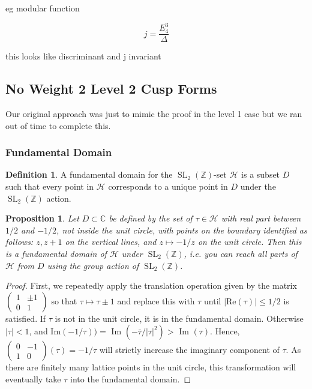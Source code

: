 \documentclass{article}
\newtheorem{proposition}{Proposition}[section]
\theoremstyle{definition}
\newtheorem{definition}{Definition}[section]
\theoremstyle{definition}
\theoremstyle{definition}
\newcommand{\SLZ}{\operatorname{SL}_2(\mathbb{Z})}
\newcommand{\C}{\mathbb{C}}
\begin{document}
eg modular function

$$j=\frac{E_4^3}{\Delta}$$

this looks like discriminant and j invariant


\subsection{No Weight 2 Level 2 Cusp Forms}

Our original approach was just to mimic the proof in the level 1 case but we ran out of time to complete this.

\subsubsection{Fundamental Domain}


\begin{definition}
    A fundamental domain for the $\SLZ$-set $\mathcal{H}$ is a subset $D$ such that every point in $\mathcal{H}$ corresponds to a unique point in $D$ under the $\SLZ$ action.
\end{definition}




\begin{proposition}
    Let $D\subset\C$ be defined by the set of $\tau\in\mathcal{H}$ with real part between $1/2$ and $-1/2$, not inside the unit circle, with points on the boundary identified as follows: $z,z+1$ on the vertical lines, and $z\mapsto -1/z$ on the unit circle. Then this is a fundamental domain of $\mathcal{H}$ under $\SLZ$, i.e. you can reach all parts of $\mathcal{H}$ from $D$ using the group action of $\SLZ$.
\end{proposition}


\begin{proof}
First, we repeatedly apply the translation operation given by the matrix $\begin{pmatrix}
1 & \pm1 \\
0 & 1
\end{pmatrix}$ so that $\tau \mapsto \tau \pm1$ and replace this with $\tau$ until $|$Re$(\tau)|\leq1/2$ is satisfied. If $\tau$ is not in the unit circle, it is in the fundamental domain. Otherwise $|\tau|<1$, and Im$(-1/\tau))=$ Im $(-\bar{\tau}/|\tau|^2)>$ Im $(\tau)$. Hence, 
$\begin{pmatrix}
0 & -1 \\
1 & 0
\end{pmatrix}(\tau)=-1/\tau$ will strictly increase the imaginary component of $\tau$. As there are finitely many lattice points in the unit circle, this transformation will eventually take $\tau$ into the fundamental domain. 
\end{proof}
\end{document}
